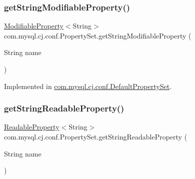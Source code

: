 \mbox{\label{interfacecom_1_1mysql_1_1cj_1_1conf_1_1_property_set_ac67409f3c62157f17e4dfb2ccd320e84}} 
\subsubsection{\texorpdfstring{get\+String\+Modifiable\+Property()}{getStringModifiableProperty()}}
{\footnotesize\ttfamily \mbox{\hyperlink{interfacecom_1_1mysql_1_1cj_1_1conf_1_1_modifiable_property}{Modifiable\+Property}}$<$String$>$ com.\+mysql.\+cj.\+conf.\+Property\+Set.\+get\+String\+Modifiable\+Property (\begin{DoxyParamCaption}\item[{String}]{name }\end{DoxyParamCaption})}



Implemented in \mbox{\hyperlink{classcom_1_1mysql_1_1cj_1_1conf_1_1_default_property_set_a44d16d90d0307d426c319163a8a0811e}{com.\+mysql.\+cj.\+conf.\+Default\+Property\+Set}}.

\mbox{\label{interfacecom_1_1mysql_1_1cj_1_1conf_1_1_property_set_ada03117e402138c98ba25e336e83d9a2}} 
\subsubsection{\texorpdfstring{get\+String\+Readable\+Property()}{getStringReadableProperty()}}
{\footnotesize\ttfamily \mbox{\hyperlink{interfacecom_1_1mysql_1_1cj_1_1conf_1_1_readable_property}{Readable\+Property}}$<$String$>$ com.\+mysql.\+cj.\+conf.\+Property\+Set.\+get\+String\+Readable\+Property (\begin{DoxyParamCaption}\item[{String}]{name }\end{DoxyParamCaption})}



